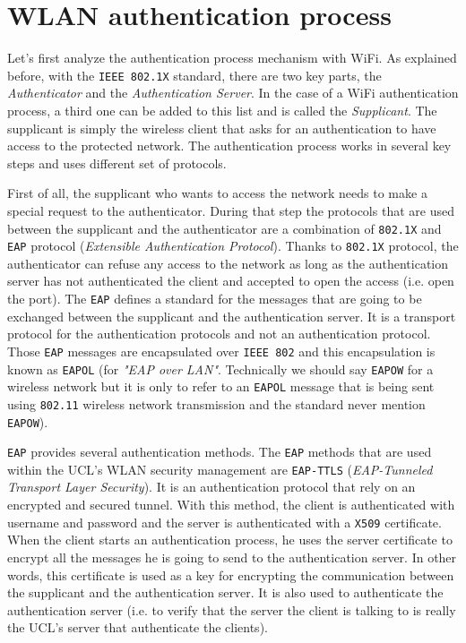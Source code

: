 \section{WLAN authentication process}
Let's first analyze the authentication process mechanism with WiFi.
As explained before, with the \texttt{IEEE 802.1X} standard, there are two key parts, the \textit{Authenticator} and the \textit{Authentication Server}. In the case of a WiFi authentication process, a third one can be added to this list and is called the \textit{Supplicant}. The supplicant is simply the wireless client that asks for an authentication to have access to the protected network. The authentication process works in several key steps and uses different set of protocols.

First of all, the supplicant who wants to access the network needs to make a special request to the authenticator. During that step the protocols that are used between the supplicant and the authenticator are a combination of \texttt{802.1X} and \texttt{EAP} protocol (\textit{Extensible Authentication Protocol}). Thanks to \texttt{802.1X} protocol, the authenticator can refuse any access to the network as long as the authentication server has not authenticated the client and accepted to open the access (i.e. open the port). The \texttt{EAP} defines a standard for the messages that are going to be exchanged between the supplicant and the authentication server. It is a  transport protocol for the authentication protocols and not an authentication protocol. Those \texttt{EAP} messages are encapsulated over \texttt{IEEE 802} and this encapsulation is known as \texttt{EAPOL} (for \textit{"EAP over LAN"}. Technically we should say \texttt{EAPOW} for a wireless network but it is only to refer to an \texttt{EAPOL} message that is being sent using \texttt{802.11} wireless network transmission and the standard never mention \texttt{EAPOW}).

\texttt{EAP} provides several authentication methods. The \texttt{EAP} methods that are used within the UCL's WLAN  security management are \texttt{EAP-TTLS} (\textit{EAP-Tunneled Transport Layer Security}). It is an authentication protocol that rely on an encrypted and secured tunnel. With this method, the client is authenticated with username and password and the server is authenticated with a \texttt{X509} certificate. When the client starts an authentication process, he uses the server certificate to encrypt all the messages he is going to send to the authentication server. In other words, this certificate is used as a key for encrypting the communication between the supplicant and the authentication server. It is also used to authenticate the authentication server (i.e. to verify that the server the client is talking to is really the UCL's server that authenticate the clients).


